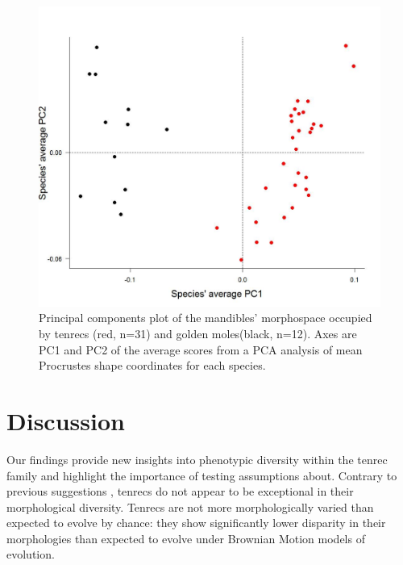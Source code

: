 \documentclass[12pt,a4paper]{article}
\begin{document}
\begin{figure}[H]
\centering
\includegraphics[width=1\linewidth]{figures/Mands_Tenrecs+Gmoles_PC1PC2_01_05_14.jpg}
\caption{Principal components plot of the mandibles' morphospace occupied by tenrecs (red, n=31) and golden moles(black, n=12). Axes are PC1 and PC2 of the average scores from a PCA analysis of mean Procrustes shape coordinates for each species. }
\label{fig:mandsPCA}

\end{figure}


\section{Discussion} %


Our findings provide new insights into phenotypic diversity within the tenrec family and highlight the importance of testing assumptions about.  
Contrary to previous suggestions \citep[e.g.][]{Eisenberg1969, Olson2013}, tenrecs do not appear to be exceptional in their morphological diversity. 
Tenrecs are not more morphologically varied than expected to evolve by chance: they show significantly lower disparity in their morphologies than expected to evolve under Brownian Motion models of evolution. 
\end{document}

